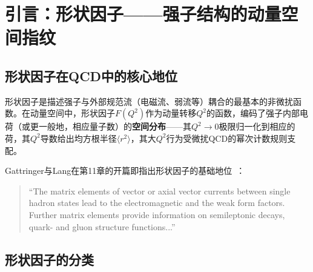 \documentclass[12pt,a4paper]{ctexart}
\theoremstyle{definition}
\begin{document}
\begin{abstract}
\textbf{第四层——核子电磁形状因子与电荷半径（§5）：}
从Dirac和Pauli形状因子$F_1(Q^2), F_2(Q^2)$到Sachs电和磁形状因子$G_E(Q^2), G_M(Q^2)$的转换。讨论核子电磁形状因子的格点计算前沿——在物理$\pi$质量下的电荷半径、磁矩、以及大$Q^2$行为的提取。

\textbf{第五层——重味遍举衰变中的形状因子（§6）：}
以$B \to \pi$和$B \to K^*$过渡形状因子为实例，展示形状因子在味物理中的核心角色——它们是将格点QCD的强子矩阵元与CKM矩阵元的实验约束联系起来的不可替代的输入。本库中的重介子光锥分布振幅计算直接贡献于这些形状因子的光锥QCD求和规则分析。

\textbf{第六层——形状因子与现代格点QCD的深度融合（§7）：}
总结形状因子在格点部分子物理中的三重角色：(i) 通过四夸克形状因子的因子化提取软函数——这是TMD因子化的核心输入；(ii) 作为遍举过程中因子化定理的规范不变矩阵元——连接实验与QCD的拉格朗日量；(iii) 作为格点方法论（三点函数、顺序源、多态拟合、外推）的基准测试平台。
\end{abstract}

\tableofcontents
\newpage

\section{引言：形状因子——强子结构的动量空间指纹}

\subsection{形状因子在QCD中的核心地位}

形状因子是描述强子与外部规范流（电磁流、弱流等）耦合的最基本的非微扰函数。在动量空间中，形状因子$F(Q^2)$作为动量转移$Q^2$的函数，编码了强子内部电荷（或更一般地，相应量子数）的\textbf{空间分布}——其$Q^2 \to 0$极限归一化到相应的荷，其$Q^2$导数给出均方根半径$\langle r^2 \rangle$，其大$Q^2$行为受微扰QCD的幂次计数规则支配。

Gattringer与Lang在第11章的开篇即指出形状因子的基础地位~\cite{GattringerLang2010}：
\begin{quote}
``The matrix elements of vector or axial vector currents between single hadron states lead to the electromagnetic and the weak form factors. Further matrix elements provide information on semileptonic decays, quark- and gluon structure functions...''
\end{quote}

\subsection{形状因子的分类}
\end{document}
